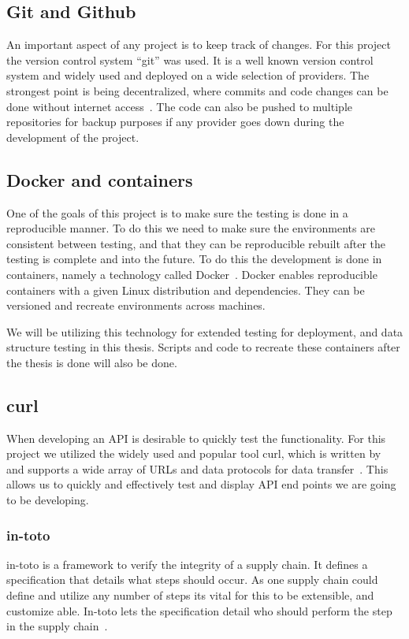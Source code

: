\documentclass[../Main/thesis.tex]{subfiles}
\begin{document}
\subsection*{Git and Github}%
\label{sub:git_and_github}
An important aspect of any project is to keep track of changes. For this project
the version control system ``git'' was used. It is a well known version control
system and widely used and deployed on a wide selection of providers. The
strongest point is being decentralized, where commits and code changes can be
done without internet access~\cite{git}. The code can also be pushed to multiple
repositories for backup purposes if any provider goes down during the
development of the project.


\subsection*{Docker and containers}%
\label{sub:docker_and_containers}
One of the goals of this project is to make sure the testing is done in a
reproducible manner. To do this we need to make sure the environments are
consistent between testing, and that they can be reproducible rebuilt after the
testing is complete and into the future. To do this the development is done in
containers, namely a technology called Docker~\cite{docker}. Docker enables
reproducible containers with a given Linux distribution and dependencies. They
can be versioned and recreate environments across machines.

We will be utilizing this technology for extended testing for deployment, and
data structure testing in this thesis. Scripts and code to recreate these
containers after the thesis is done will also be done.

\subsection*{curl}%
\label{sub:curl}
When developing an API is desirable to quickly test the functionality. For this
project we utilized the widely used and popular tool curl, which is written
by~\citeauthor{curl} and supports a wide array of URLs and data protocols for
data transfer~\cite{curl}. This allows us to quickly and effectively test and
display API end points we are going to be developing.


\subsubsection*{in-toto}%
\label{sub:in-toto}
in-toto is a framework to verify the integrity of a supply chain. It defines a
specification that details what steps should occur. As one supply chain could
define and utilize any number of steps its vital for this to be extensible, and
customize able. In-toto lets the specification detail who should perform the
step in the supply chain~\cite{in-toto}.
\end{document}
